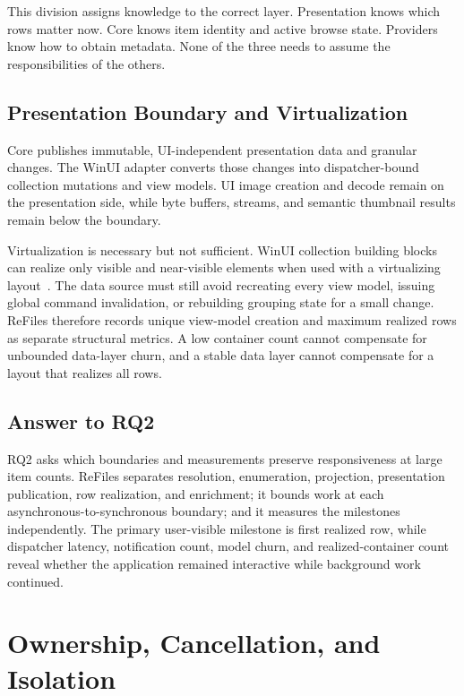 \documentclass[10pt,a4paper,twoside]{article}
\begin{document}
This division assigns knowledge to the correct layer. Presentation knows which rows matter now. Core knows item
identity and active browse state. Providers know how to obtain metadata. None of the three needs to assume the
responsibilities of the others.

\subsection{Presentation Boundary and Virtualization}

Core publishes immutable, UI-independent presentation data and granular changes. The WinUI adapter converts
those changes into dispatcher-bound collection mutations and view models. UI image creation and decode remain on
the presentation side, while byte buffers, streams, and semantic thumbnail results remain below the boundary.

Virtualization is necessary but not sufficient. WinUI collection building blocks can realize only visible and
near-visible elements when used with a virtualizing layout~\cite{winui-items-repeater}. The data source must still
avoid recreating every view model, issuing global command invalidation, or rebuilding grouping state for a small
change. ReFiles therefore records unique view-model creation and maximum realized rows as separate structural
metrics. A low container count cannot compensate for unbounded data-layer churn, and a stable data layer cannot
compensate for a layout that realizes all rows.

\subsection{Answer to RQ2}

RQ2 asks which boundaries and measurements preserve responsiveness at large item counts. ReFiles separates
resolution, enumeration, projection, presentation publication, row realization, and enrichment; it bounds work
at each asynchronous-to-synchronous boundary; and it measures the milestones independently. The primary
user-visible milestone is first realized row, while dispatcher latency, notification count, model churn, and
realized-container count reveal whether the application remained interactive while background work continued.

\section{Ownership, Cancellation, and Isolation}
\label{section:ownership}
\end{document}
